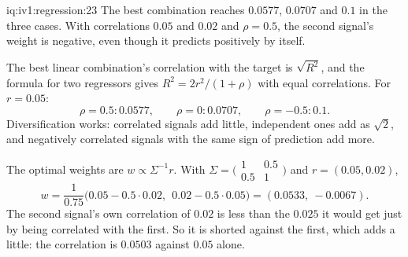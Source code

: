 \begin{solution}{iq:iv1:regression:23}
The best combination reaches $0.0577$, $0.0707$ and $0.1$ in the three cases. With correlations $0.05$ and $0.02$ and $\rho = 0.5$, the second signal's weight is negative, even though it predicts positively by itself.

The best linear combination's correlation with the target is $\sqrt{R^2}$, and the formula for two regressors gives $R^2 = 2r^2/(1 + \rho)$ with equal correlations. For $r = 0.05$:
\[
\rho = 0.5 : 0.0577, \qquad \rho = 0 : 0.0707, \qquad \rho = -0.5 : 0.1.
\]
Diversification works: correlated signals add little, independent ones add as $\sqrt2$, and negatively correlated signals with the same sign of prediction add more.

The optimal weights are $w \propto \Sigma^{-1}r$. With $\Sigma = \bigl(\begin{smallmatrix}1 & 0.5\\ 0.5 & 1\end{smallmatrix}\bigr)$ and $r = (0.05, 0.02)$,
\[
w = \frac{1}{0.75}\bigl(0.05 - 0.5 \cdot 0.02,\ \ 0.02 - 0.5 \cdot 0.05\bigr) = (0.0533,\ -0.0067).
\]
The second signal's own correlation of $0.02$ is less than the $0.025$ it would get just by being correlated with the first. So it is shorted against the first, which adds a little: the correlation is $0.0503$ against $0.05$ alone.

\end{solution}

